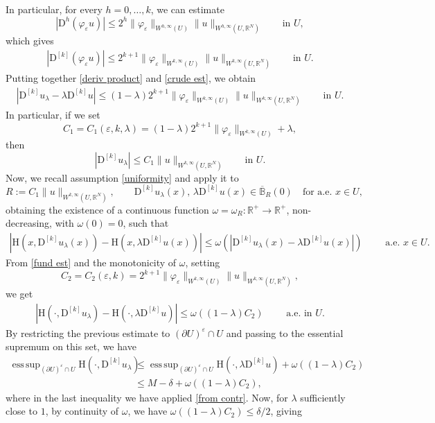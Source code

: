 \documentclass[a4paper,11pt]{article}
\numberwithin{equation}{section}
\newcommand{\numberset}{\mathbb}
\newcommand{\eps}{\varepsilon}
\newcommand{\R}{\numberset{R}}
\newcommand{\rom}{\mathrm}
\DeclareMathOperator*{\esssup}{ess\,sup}
\theoremstyle{definition}
\begin{document}
In particular, for every $h=0,\ldots, k$, we can estimate
$$
|\mathrm D^h(\varphi_\eps u)|\leq 2^h\|\varphi_\eps\|_{W^{h,\infty}(U)}\|u\|_{W^{h,\infty}(U,\R^N)}\qquad \mbox{in }U, 
$$
which gives
\begin{align}\label{crude est}
|\mathrm D^{[k]}(\varphi_\eps u)|\leq 2^{k+1}\|\varphi_\eps\|_{W^{k,\infty}(U)}\|u\|_{W^{k,\infty}(U,\R^N)}\qquad \mbox{in }U.
\end{align}
Putting together \eqref{deriv product} and \eqref{crude est}, we obtain
\begin{align}\label{fund est}
|\mathrm D^{[k]}u_\lambda-\lambda \mathrm D^{[k]}u|\leq(1-\lambda)2^{k+1}\|\varphi_\eps\|_{W^{k,\infty}(U)}\|u\|_{W^{k,\infty}(U,\R^N)}\qquad\mbox{in }U.
\end{align}
In particular, if we set 
$$C_1=C_1(\eps,k,\lambda)=(1-\lambda)2^{k+1}\|\varphi_\eps\|_{W^{k,\infty}(U)}+\lambda,$$
then
$$
|\mathrm D^{[k]}u_\lambda|\leq C_1\|u\|_{W^{k,\infty}(U,\R^N)}\qquad\mbox{in }U.
$$
Now, we recall assumption \eqref{uniformity} and apply it to $$R:=C_1\|u\|_{W^{k,\infty}(U,\R^N)}, \qquad\mathrm D^{[k]}u_\lambda(x),\,\lambda\mathrm D^{[k]}u(x)\in \overline{\mathbb B}_R(0)\quad\mbox{for a.e.   }x\in U,$$
obtaining the existence of a continuous function $\omega=\omega_R:\R^+\to\R^+$, non-decreasing, with $\omega(0)=0$, such that
\begin{align*}
|\rom{H}(x,\mathrm D^{[k]}u_\lambda(x))-\rom{H}(x,\lambda\mathrm D^{[k]}u(x))|\leq \omega(|\mathrm D^{[k]}u_\lambda(x)-\lambda\mathrm D^{[k]}u(x)|)\qquad\mbox{ a.e. }x\in U.
\end{align*} 
From \eqref{fund est} and the monotonicity of $\omega$, setting
$$
C_2=C_2(\eps,k)=2^{k+1}\|\varphi_\eps\|_{W^{k,\infty}(U)}\|u\|_{W^{k,\infty}(U,\R^N)},
$$
we get
\begin{align*}
|\rom{H}(\cdot,\mathrm D^{[k]}u_\lambda)-\rom{H}(\cdot,\lambda\mathrm D^{[k]}u)|\leq \omega\left((1-\lambda)C_2\right)\qquad\mbox{ a.e. in } U.
\end{align*}
By restricting the previous estimate to $(\partial U)^\eps\cap U$ and passing to the essential supremum on this set, we have
\begin{align*}
\esssup_{(\partial U)^\eps\cap U}\rom{H}(\cdot, \mathrm D^{[k]}u_\lambda)&\leq\esssup_{(\partial U)^\eps\cap U}\rom{H}(\cdot, \lambda\mathrm D^{[k]}u)+ \omega\left((1-\lambda)C_2\right)\\
&\leq M-\delta +\omega\left((1-\lambda)C_2\right),
\end{align*}
where in the last inequality we have applied \eqref{from contr}. Now, for $\lambda$ sufficiently close to $1$, by continuity of $\omega$, we have $\omega\left((1-\lambda)C_2\right)\leq\delta/2$, giving
\end{document}
